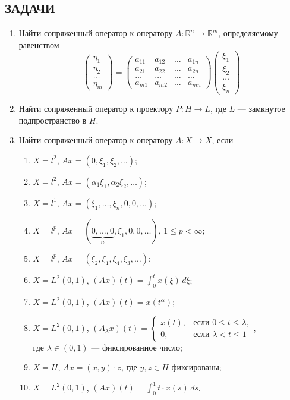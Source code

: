 \documentclass[12pt,a4paper]{article}
\begin{document}
\subsection*{ЗАДАЧИ}
\begin{enumerate}
\item Найти сопряженный оператор к оператору $A: \mathbb{R}^{n} \rightarrow \mathbb{R}^{m}$, определяемому равенством
$$
\begin{pmatrix} \eta_{1} \\ \eta_{2} \\ \dots \\ \eta_{m}
\end{pmatrix} =
\begin{pmatrix} a_{11} & a_{12} & \dots & a_{1n} \\ a_{21} & a_{22} & \dots & a_{2n} \\ \dots & \dots & \dots & \dots \\ a_{m1} & a_{m2} & \dots & a_{mn}
\end{pmatrix}
\begin{pmatrix} \xi_{1} \\ \xi_{2} \\ \dots \\ \xi_{n}
\end{pmatrix} $$

\item Найти сопряженный оператор к проектору $P: H \rightarrow L$, где $L$ — замкнутое подпространство в $H$.

\item Найти сопряженный оператор к оператору $A: X \rightarrow X$, если
\begin{enumerate}[label=\alph*)]
\item $X = l^{2}$, $Ax = (0, \xi_{1}, \xi_{2}, \dots)$;
\item $X = l^{2}$, $Ax = (\alpha_{1}\xi_{1}, \alpha_{2}\xi_{2}, \dots)$;
\item $X = l^{1}$, $Ax = (\xi_{1}, \dots, \xi_{n}, 0, 0, \dots)$;
\item $X = l^{p}$, $Ax = (\underbrace{0, \dots, 0}_{n}, \xi_{1}, 0, 0, \dots)$, $1 \le p < \infty$;
\item $X = l^{p}$, $Ax = (\xi_{2}, \xi_{1}, \xi_{4}, \xi_{3}, \dots)$;
\item $X = L^{2}(0,1)$, $(Ax)(t) = \int_{0}^{t} x(\xi) \, d\xi$;
\item $X = L^{2}(0,1)$, $(Ax)(t) = x(t^{\alpha})$;
\item $X = L^{2}(0,1)$, $(A_{\lambda}x)(t) =
\begin{cases} x(t), & \text{если } 0 \le t \le \lambda, \\ 0, & \text{если } \lambda < t \le 1
\end{cases}$, \\ где $\lambda \in (0,1)$ — фиксированное число;
\item $X = H$, $Ax = (x, y) \cdot z$, где $y, z \in H$ фиксированы;
\item $X = L^{2}(0,1)$, $(Ax)(t) = \int_{0}^{1} t \cdot x(s) \, ds$.
\end{enumerate}


\end{enumerate}
\end{document}
